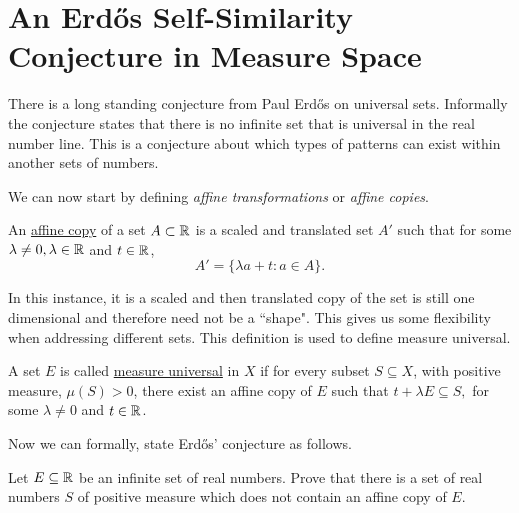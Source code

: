 \section{An Erd\H{o}s Self\hyphen{Similarity} Conjecture in Measure Space}
There is a long standing conjecture from Paul Erd\H{o}s on universal sets.  Informally the conjecture states that there is no infinite set that is universal in the real number line.  This is a conjecture about which types of  patterns can exist within another sets of numbers.  


We can now start by defining \textit{affine transformations} or \textit{affine copies}.
\begin{definition}
    An \underline{affine copy} of a set $A \subset \mathbb{R}$ is a scaled and translated set $A'$ such that for some $\lambda\neq 0, \lambda \in \mathbb{R}$ and $t \in \mathbb{R}$,  $$A' = \{\lambda a + t : a \in A\}.$$
\end{definition}

In this instance, it is a scaled and then translated copy of the set is still one dimensional and therefore need not be a ``shape".  This gives us some flexibility when addressing different sets.  This definition is used to define measure universal. 

\begin{definition}
    A set $E$ is called \underline{measure universal} in $X$ if for every subset $S \subseteq X$, with positive measure, $\mu (S) > 0$, there exist an affine copy of $E$ such that $t+\lambda E \subseteq S,$ for some $\lambda \neq 0$ and $t \in \mathbb{R}$.  
\end{definition}

Now we can formally, state Erd\H{o}s' conjecture as follows. 

\begin{conjecture}\label{ErdConj}
    Let $E\subseteq \mathbb{R}$ be an infinite set of real numbers.  Prove that there is a set of real numbers $S$ of positive measure which does not contain an affine copy of $E$.  
\end{conjecture}

